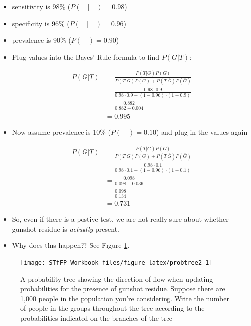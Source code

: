 \documentclass[]{book}
\providecommand{\tightlist}{%
  \setlength{\itemsep}{0pt}\setlength{\parskip}{0pt}}
\theoremstyle{definition}
\theoremstyle{definition}
\theoremstyle{remark}
\begin{document}
\begin{itemize}
\tightlist
\item
  sensitivity is 98\% (\(P(\quad|\quad) = 0.98\)) \vspace{.1in}
\item
  specificity is 96\% (\(P(\quad|\quad) = 0.96\)) \vspace{.1in}
\item
  prevalence is 90\% (\(P(\quad) = 0.90\)) \vspace{.1in}
\item
  Plug values into the Bayes' Rule formula to find \(P(G|T)\):

  \begin{equation}\label{eq:5}
  \begin{split}
   P(G|T) & = \frac{P(T|G)P(G)}{P(T|G)P(G) + P(T|\overline{G})P(\overline{G})} \\ 
   & = \frac{0.98 \cdot 0.9}{0.98 \cdot 0.9 + (1- 0.96)\cdot (1-0.9)} \\ 
   & = \frac{0.882}{0.882 + 0.004} \\
   & = 0.995
  \end{split}
  \end{equation}
\item
  Now assume prevalence is 10\% (\(P(\quad) = 0.10\)) and plug in the
  values again \vspace{.1in}

  \begin{equation}\label{eq:6}
  \begin{split}
   P(G|T) & = \frac{P(T|G)P(G)}{P(T|G)P(G) + P(T|\overline{G})P(\overline{G})} \\ 
   & = \frac{0.98 \cdot 0.1}{0.98 \cdot 0.1 + (1- 0.96)\cdot (1-0.1)} \\ 
   & = \frac{0.098}{0.098 + 0.036} \\
   & = \frac{0.098}{0.134} \\
   & = 0.731
  \end{split}
  \end{equation}
\item
  So, even if there is a postive test, we are not really sure about
  whether gunshot residue is \emph{actually} present.
\item
  Why does this happen?? See Figure \ref{fig:probtree2}.
\end{itemize}

\begin{figure}[h]

{\centering \texttt{[image: STfFP-Workbook\_files/figure-latex/probtree2-1]} 

}

\caption{A probability tree showing the direction of flow when updating probabilities for the presence of gunshot residue. Suppose there are 1,000 people in the population you're considering. Write the number of people in the groups throughout the tree according to the probabilities indicated on the branches of the tree}\label{fig:probtree2}
\end{figure}
\end{document}
